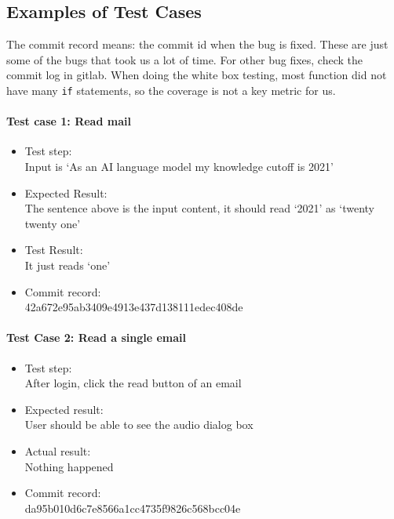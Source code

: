 \documentclass{article}
\begin{document}
\subsection{Examples of Test Cases}
The commit record means: the commit id when the bug is fixed.
These are just some of the bugs that took us a lot of time. For other bug fixes, check the commit log in gitlab. 
When doing the white box testing, most function did not have many \texttt{if} statements, so the coverage is not a key metric for us.

\paragraph{Test case 1: Read mail}
\begin{itemize}
\item Test step: \\
    Input is ‘As an AI language model my knowledge cutoff is 2021’
\item Expected Result: \\
    The sentence above is the input content, it should read ‘2021’ as ‘twenty twenty one’
\item Test Result: \\
    It just reads ‘one’
\item Commit record: \\
    42a672e95ab3409e4913e437d138111edec408de
\end{itemize}


\paragraph{Test Case 2: Read a single email}
\begin{itemize}
\item Test step: \\
    After login, click the read button of an email
\item Expected result: \\
    User should be able to see the audio dialog box
\item Actual result: \\
    Nothing happened
\item Commit record: \\
    da95b010d6c7e8566a1cc4735f9826c568bcc04e
\end{itemize}
\end{document}
